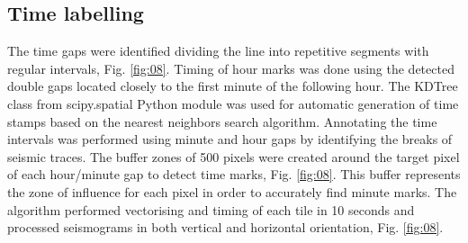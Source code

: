 \documentclass[a4paper,english,12pt]{article}
\begin{document}
\subsection{Time labelling}
The time gaps were identified dividing the line into repetitive segments with regular intervals, Fig. \ref{fig:08}. Timing of hour marks was done using the detected double gaps located closely to the first minute of the following hour. The KDTree class from scipy.spatial Python module was used for automatic generation of time stamps based on the nearest neighbors search algorithm. Annotating the time intervals was performed using minute and hour gaps by identifying the breaks of seismic traces. The buffer zones of 500 pixels were created around the target pixel of each hour/minute gap to detect time marks, Fig. \ref{fig:08}. This buffer represents the zone of influence for each pixel in order to accurately find minute marks. The algorithm performed vectorising and timing of each tile in 10 seconds and processed seismograms in both vertical and horizontal orientation, Fig. \ref{fig:08}.
\end{document}
